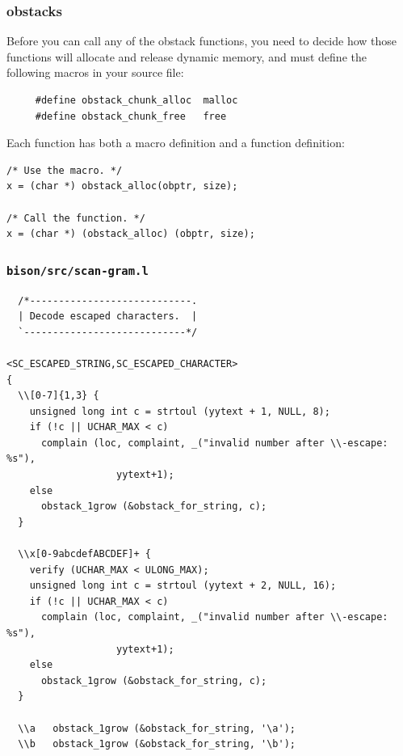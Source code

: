\documentclass{beamer}
\begin{document}
\begin{frame}[fragile]
  \frametitle{obstacks}

Before you can call any of the obstack functions, you need to decide how those
functions will allocate and release dynamic memory, and must define the
following macros in your source file:

\begin{verbatim}
     #define obstack_chunk_alloc  malloc
     #define obstack_chunk_free   free
\end{verbatim}

\vfill

Each function has both a macro definition and a function definition:

\begin{verbatim}
/* Use the macro. */
x = (char *) obstack_alloc(obptr, size);

/* Call the function. */
x = (char *) (obstack_alloc) (obptr, size);
\end{verbatim}
\end{frame}

\begin{frame}[fragile,shrink=25]
  \frametitle{\texttt{bison/src/scan-gram.l}}
\begin{verbatim}
  /*----------------------------.
  | Decode escaped characters.  |
  `----------------------------*/

<SC_ESCAPED_STRING,SC_ESCAPED_CHARACTER>
{
  \\[0-7]{1,3} {
    unsigned long int c = strtoul (yytext + 1, NULL, 8);
    if (!c || UCHAR_MAX < c)
      complain (loc, complaint, _("invalid number after \\-escape: %s"),
                   yytext+1);
    else
      obstack_1grow (&obstack_for_string, c);
  }

  \\x[0-9abcdefABCDEF]+ {
    verify (UCHAR_MAX < ULONG_MAX);
    unsigned long int c = strtoul (yytext + 2, NULL, 16);
    if (!c || UCHAR_MAX < c)
      complain (loc, complaint, _("invalid number after \\-escape: %s"),
                   yytext+1);
    else
      obstack_1grow (&obstack_for_string, c);
  }

  \\a   obstack_1grow (&obstack_for_string, '\a');
  \\b   obstack_1grow (&obstack_for_string, '\b');
\end{verbatim}
\end{frame}
\end{document}
